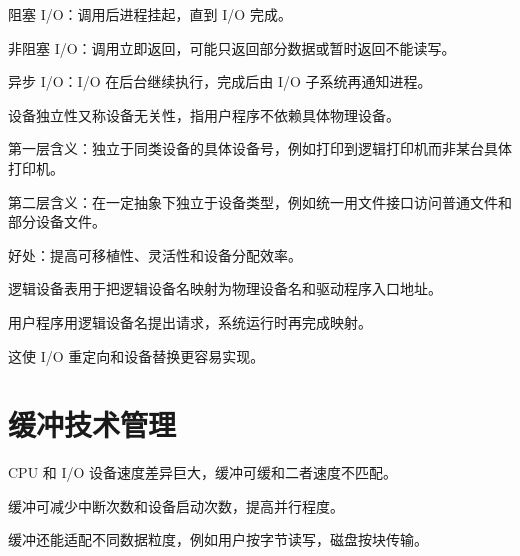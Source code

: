 \begin{points}
  \item 阻塞 I/O：调用后进程挂起，直到 I/O 完成。
  \item 非阻塞 I/O：调用立即返回，可能只返回部分数据或暂时返回不能读写。
  \item 异步 I/O：I/O 在后台继续执行，完成后由 I/O 子系统再通知进程。
\end{points}


\begin{points}
  \item 设备独立性又称设备无关性，指用户程序不依赖具体物理设备。
  \item 第一层含义：独立于同类设备的具体设备号，例如打印到逻辑打印机而非某台具体打印机。
  \item 第二层含义：在一定抽象下独立于设备类型，例如统一用文件接口访问普通文件和部分设备文件。
  \item 好处：提高可移植性、灵活性和设备分配效率。
\end{points}


\begin{points}
  \item 逻辑设备表用于把逻辑设备名映射为物理设备名和驱动程序入口地址。
  \item 用户程序用逻辑设备名提出请求，系统运行时再完成映射。
  \item 这使 I/O 重定向和设备替换更容易实现。
\end{points}


\section{缓冲技术管理}
\begin{points}
  \item CPU 和 I/O 设备速度差异巨大，缓冲可缓和二者速度不匹配。
  \item 缓冲可减少中断次数和设备启动次数，提高并行程度。
  \item 缓冲还能适配不同数据粒度，例如用户按字节读写，磁盘按块传输。
\end{points}



